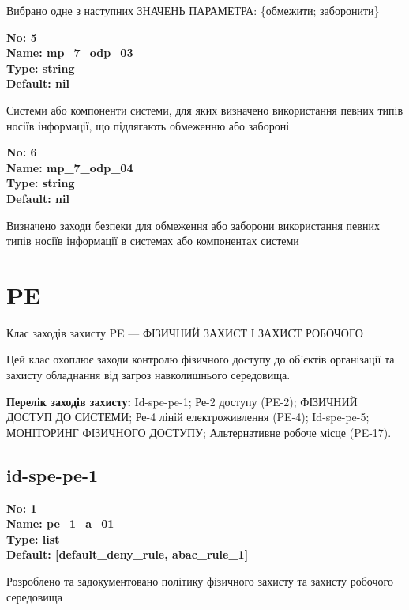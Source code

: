 \documentclass{article}
\begin{document}
{\footnotesize Вибрано одне з наступних ЗНАЧЕНЬ ПАРАМЕТРА: \{обмежити; заборонити\}}


{\footnotesize\bfseries
No: 5\\
Name: mp\_\allowbreak{}7\_\allowbreak{}odp\_\allowbreak{}03\\
Type: string\\
Default: nil
}

{\footnotesize Системи або компоненти системи, для яких визначено використання певних типів носіїв інформації, що підлягають обмеженню або забороні}


{\footnotesize\bfseries
No: 6\\
Name: mp\_\allowbreak{}7\_\allowbreak{}odp\_\allowbreak{}04\\
Type: string\\
Default: nil
}

{\footnotesize Визначено заходи безпеки для обмеження або заборони використання певних типів носіїв інформації в системах або компонентах системи}




\section{PE}
Клас заходів захисту PE --- ФІЗИЧНИЙ ЗАХИСТ І ЗАХИСТ РОБОЧОГО

Цей клас охоплює заходи контролю фізичного доступу до об'єктів організації та захисту обладнання від загроз навколишнього середовища.

\textbf{Перелік заходів захисту:} Id-spe-pe-1; Ре-2 доступу (PE-2); ФІЗИЧНИЙ ДОСТУП ДО СИСТЕМИ; Ре-4 ліній електроживлення (PE-4); Id-spe-pe-5; МОНІТОРИНГ ФІЗИЧНОГО ДОСТУПУ; Альтернативне робоче місце (PE-17).

\subsection{id-spe-pe-1}


\vspace{10pt}
{\footnotesize\bfseries
No: 1\\
Name: pe\_\allowbreak{}1\_\allowbreak{}a\_\allowbreak{}01\\
Type: list\\
Default: [\textquotedbl{}default\_\allowbreak{}deny\_\allowbreak{}rule\textquotedbl{}, \textquotedbl{}abac\_\allowbreak{}rule\_\allowbreak{}1\textquotedbl{}]
}

{\footnotesize Розроблено та задокументовано політику фізичного захисту та захисту робочого середовища}
\end{document}
